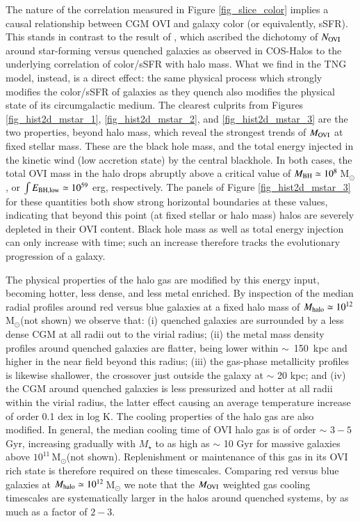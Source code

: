 \documentclass[useAMS,usenatbib]{mnras}
\newcommand{\msun}{\,M$_{\odot}$\xspace}
\newcommand{\ovi}{OVI\xspace}
\begin{document}
The nature of the correlation measured in Figure \ref{fig_slice_color} implies a causal relationship between CGM \ovi and galaxy color (or equivalently, sSFR). This stands in contrast to the result of \cite{oppenheimer16}, which ascribed the dichotomy of $N_{\rm OVI}$ around star-forming versus quenched galaxies as observed in COS-Halos to the underlying correlation of color/sSFR with halo mass. What we find in the TNG model, instead, is a direct effect: the same physical process which strongly modifies the color/sSFR of galaxies as they quench also modifies the physical state of its circumgalactic medium. The clearest culprits from Figures \ref{fig_hist2d_mstar_1}, \ref{fig_hist2d_mstar_2}, and \ref{fig_hist2d_mstar_3} are the two properties, beyond halo mass, which reveal the strongest trends of $M_{\rm OVI}$ at fixed stellar mass. These are the black hole mass, and the total energy injected in the kinetic wind (low accretion state) by the central blackhole. In both cases, the total \ovi mass in the halo drops abruptly above a critical value of $M_{\rm BH} \simeq 10^{8}$\msun, or $\int E_{\rm BH,low} \simeq 10^{59}$ erg, respectively. The panels of Figure \ref{fig_hist2d_mstar_3} for these quantities both show strong horizontal boundaries at these values, indicating that beyond this point (at fixed stellar or halo mass) halos are severely depleted in their \ovi content. Black hole mass as well as total energy injection can only increase with time; such an increase therefore tracks the evolutionary progression of a galaxy.

The physical properties of the halo gas are modified by this energy input, becoming hotter, less dense, and less metal enriched. By inspection of the median radial profiles around red versus blue galaxies at a fixed halo mass of $M_{\rm halo} \simeq 10^{12}$\msun (not shown) we observe that: (i) quenched galaxies are surrounded by a less dense CGM at all radii out to the virial radius; (ii) the metal mass density profiles around quenched galaxies are flatter, being lower within \mbox{$\sim$ 150 kpc} and higher in the near field beyond this radius; (iii) the gas-phase metallicity profiles is likewise shallower, the crossover just outside the galaxy at $\sim$ 20 kpc; and (iv) the CGM around quenched galaxies is less pressurized and hotter at all radii within the virial radius, the latter effect causing an average temperature increase of order 0.1 dex in log K. The cooling properties of the halo gas are also modified. In general, the median cooling time of \ovi halo gas is of order $\sim$ $3-5$ Gyr, increasing gradually with $M_\star$ to as high as $\sim$ 10 Gyr for massive galaxies above $10^{11}$\msun (not shown). Replenishment or maintenance of this gas in its \ovi rich state is therefore required on these timescales. Comparing red versus blue galaxies at $M_{\rm halo} \simeq 10^{12}$\msun we note that the $M_{\rm OVI}$ weighted gas cooling timescales are systematically larger in the halos around quenched systems, by as much as a factor of $2-3$.
\end{document}
